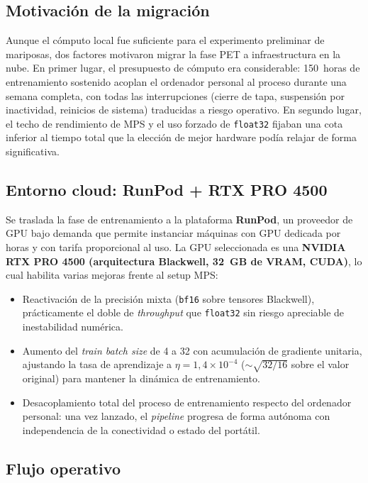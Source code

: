 \subsection{Motivación de la migración}

Aunque el cómputo local fue suficiente para el experimento
preliminar de mariposas, dos factores motivaron migrar la fase
PET a infraestructura en la nube. En primer lugar, el presupuesto
de cómputo era considerable: 150~horas de entrenamiento sostenido
acoplan el ordenador personal al proceso durante una semana
completa, con todas las interrupciones (cierre de tapa, suspensión
por inactividad, reinicios de sistema) traducidas a riesgo
operativo. En segundo lugar, el techo de rendimiento de MPS y el
uso forzado de \texttt{float32} fijaban una cota inferior al
tiempo total que la elección de mejor hardware podía relajar de
forma significativa.

\subsection{Entorno cloud: RunPod + RTX PRO 4500}

Se traslada la fase de entrenamiento a la plataforma
\textbf{RunPod}, un proveedor de GPU bajo demanda que permite
instanciar máquinas con GPU dedicada por horas y con tarifa
proporcional al uso. La GPU seleccionada es una \textbf{NVIDIA
RTX PRO 4500 (arquitectura Blackwell, 32~GB de VRAM, CUDA)}, lo
cual habilita varias mejoras frente al setup MPS:

\begin{itemize}[leftmargin=*]
    \item Reactivación de la precisión mixta (\texttt{bf16}
    sobre tensores Blackwell), prácticamente el doble de
    \textit{throughput} que \texttt{float32} sin riesgo
    apreciable de inestabilidad numérica.
    \item Aumento del \textit{train batch size} de 4 a 32 con
    acumulación de gradiente unitaria, ajustando la tasa de
    aprendizaje a $\eta = 1{,}4 \times 10^{-4}$
    ($\sim\sqrt{32/16}$ sobre el valor original) para mantener
    la dinámica de entrenamiento.
    \item Desacoplamiento total del proceso de entrenamiento
    respecto del ordenador personal: una vez lanzado, el
    \textit{pipeline} progresa de forma autónoma con
    independencia de la conectividad o estado del portátil.
\end{itemize}

\subsection{Flujo operativo}

